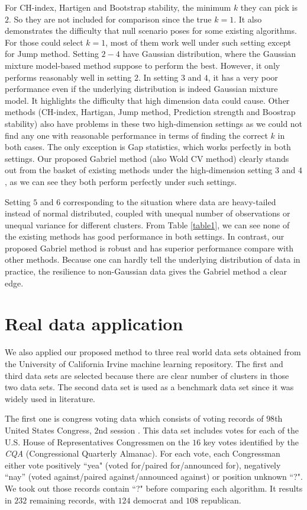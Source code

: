 \documentclass[11pt]{article}
\begin{document}
For CH-index, Hartigen and Bootstrap stability, the minimum $k$ they can pick is $2$. So they are not
included for comparison since the true $k=1$. It also demonstrates the difficulty 
that null scenario poses for some existing algorithms. For those could select $k=1$,
most of them work well under such setting except for Jump method. Setting $2-4$ have Gaussian
distribution, where the Gaussian mixture model-based method suppose to
perform the best. However, it only performs reasonably well in setting $2$. In setting $3$ and $4$,
it has a very poor performance even if the underlying distribution is indeed
Gaussian mixture model. It highlights the difficulty that high dimension
data could cause. Other methods (CH-index, Hartigan, Jump
method, Prediction strength and Boostrap stability) also have problems in
these two high-dimension settings as we could not find any one with reasonable
performance in terms of finding the correct $k$ in both cases. The only exception is
Gap statistics, which works perfectly in both settings. Our proposed Gabriel method (also Wold
CV method) clearly stands out from the basket of existing methods under the 
high-dimension setting $3$ and $4$, as we can see they both perform perfectly under
such settings. 


Setting $5$ and $6$ corresponding to the situation where data are heavy-tailed
instead of normal distributed, coupled with unequal number of observations or
unequal variance for different clusters. From Table \ref{table1}, we can see none of 
the existing methods has good performance in both settings. In contrast,
our proposed Gabriel method is robust and has superior performance
compare with other methods. Because one can hardly tell the underlying
distribution of data in practice, the resilience to non-Gaussian data gives
the Gabriel method a clear edge. 



\section{Real data application}

We also applied our proposed method to three real world data sets obtained
from the University of California Irvine machine learning repository. The
first and third data sets are selected because there are clear number of
clusters in those two data sets. The second data set is used as a benchmark
data set since it was widely used in literature.


The first one is congress voting data which consists of voting records of
$98$th United States Congress, $2$nd session \citep{schlimmer1987concept}. 
This data set includes votes for each of the U.S. House of Representatives Congressmen on the $16$ key votes
identified by the \textit{CQA} (Congressional Quarterly Almanac). For each
vote, each Congressman either vote positively ``yea" (voted for/paired
for/announced for),  negatively ``nay'' (voted against/paired
against/announced against) or position unknown ``?". We took out those records
contain ``?" before comparing each algorithm. It results in $232$ remaining
records, with $124$ democrat and $108$ republican. 
\end{document}
